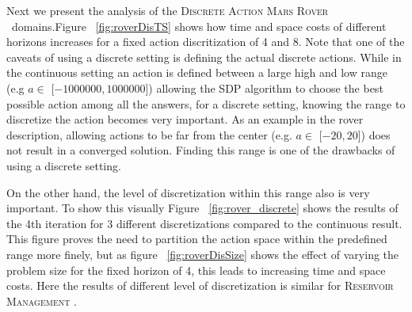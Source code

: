 \documentclass[twoside,11pt]{article}
\newcommand{\MarsRover}{\textsc{Mars Rover }}
\newcommand{\WaterReservoir}{\textsc{Reservoir Management }}
\begin{document}
Next we present the analysis of the \textsc{Discrete Action} \MarsRover\ domains.Figure ~\ref{fig:roverDisTS} shows how time and space costs of different horizons increases for a fixed action discritization of 4 and 8.
Note that one of the caveats of using a discrete setting is defining the actual discrete actions. While in the continuous setting an action is defined between a large high and low range (e.g $a \in$ [$-1000000,1000000$]) allowing the SDP algorithm to choose the best possible action among all the answers, for a discrete setting, knowing the range to discretize the action becomes very important. As an example in the rover description, allowing actions to be far from the center (e.g. $a \in$ [$-20,20$]) does not result in a converged solution. Finding this range is one of the drawbacks of using a discrete setting. 

On the other hand, the level of discretization within this range also is very important. To show this visually Figure ~\ref{fig:rover_discrete} shows the results of the 4th iteration for 3 different discretizations compared to the continuous result. This figure proves the need to partition the action space within the predefined range more finely, but as figure ~\ref{fig:roverDisSize} shows  the effect of varying the  problem size for the fixed horizon of 4, this leads to increasing time and space costs. Here the results of different level of discretization is similar for \WaterReservoir.
\end{document}
